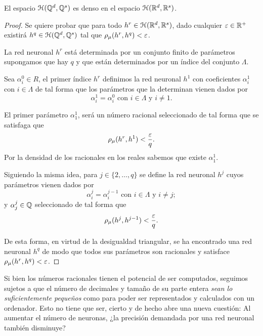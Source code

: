 \begin{aportacionOriginal}
    \begin{teorema}
        El espacio $\mathcal{H}(\mathbb{Q}^d, \mathbb{Q}^s)$ es denso en el espacio $\mathcal{H}(\mathbb{R}^d,\mathbb{R}^s)$. 
    \end{teorema}
    \begin{proof}
        Se quiere probar que para todo $h^r \in \mathcal{H}(\mathbb{R}^d,\mathbb{R}^s)$,
         dado cualquier $\varepsilon \in \mathbb{R}^+$  
        existirá $h^q \in \mathcal{H}(\mathbb{Q}^d, \mathbb{Q}^s)$ tal que 
        $\rho_{\mu}( h^r, h^q) < \varepsilon$. 

        La red neuronal $h^r$ está determinada por un conjunto finito
        de parámetros supongamos que hay $q$ y que están determinados por un índice del conjunto $\Lambda$. 

        Sea $\alpha^0_i \in R$, el primer índice $h^r$ definimos la red neuronal $h^1$ con coeficientes  $\alpha^1_i$ con $i\in \Lambda$
        de tal forma que los parámetros que la determinan vienen dados por
        \begin{equation*}
            \alpha^1_i = \alpha^0_i 
            \text{ con } i \in \Lambda
            \text{ y } i \neq 1.
        \end{equation*}

        El primer parámetro $\alpha^1_1$, será un número racional 
        seleccionado de tal forma que se satisfaga que 
        \begin{equation*}
            \rho_{\mu}( h^r, h^1) < \frac{\varepsilon}{q}.
        \end{equation*}
        Por la densidad de los racionales en los reales sabemos que  existe $\alpha^1_1$.

        Siguiendo la misma idea, para $j \in \{2,\ldots, q\}$ se define la red neuronal 
        $h^j$ cuyos parámetros vienen dados por 
        \begin{equation*}
            \alpha^j_i = \alpha^{j-1}_i 
            \text{ con } i \in \Lambda
            \text{ y } i \neq j;
        \end{equation*}
        y $\alpha^j_j \in \mathbb{Q}$ seleccionado de tal forma que  
        \begin{equation*}
            \rho_{\mu}( h^j, h^{j-1}) < \frac{\varepsilon}{q}.
        \end{equation*}

        De esta forma, en virtud de la desigualdad triangular,  se ha 
        encontrado una red neuronal $h^q$
        de modo que todos sus parámetros son racionales y 
        satisface 
        $\rho_{\mu}( h^r, h^q) < \varepsilon$.
    \end{proof}

    Si bien los números racionales tienen el potencial de ser computados, seguimos sujetos a que el número de decimales y tamaño de su parte entera \textit{sean lo suficientemente pequeños} como para poder ser representados 
    y calculados con un ordenador. Esto no tiene que ser, cierto y de hecho abre una nueva cuestión:
     Al aumentar el número de neuronas, ¿la precisión demandada por una red neuronal también disminuye?  
\end{aportacionOriginal} 

